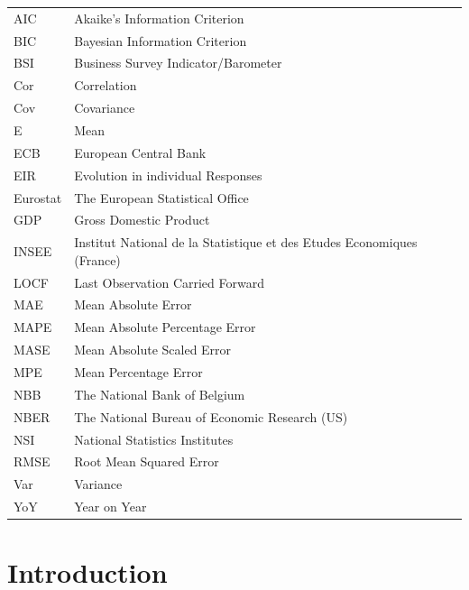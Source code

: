 \documentclass[12pt,a4paper,oneside]{book}
\begin{document}
\begin{tabular}{l l}
  AIC       & Akaike's Information Criterion \\
  BIC		& Bayesian Information Criterion \\
  BSI       & Business Survey Indicator/Barometer \\
  Cor       & Correlation \\
  Cov       & Covariance \\
  E         & Mean \\
  ECB       & European Central Bank \\
  EIR       & Evolution in individual Responses \\
  Eurostat  & The European Statistical Office \\
  GDP       & Gross Domestic Product \\
  INSEE     & Institut National de la Statistique et des Etudes Economiques (France) \\
  LOCF 		& Last Observation Carried Forward \\
  MAE 		& Mean Absolute Error \\
  MAPE		& Mean Absolute Percentage Error \\
  MASE 		& Mean Absolute Scaled Error \\
  MPE 		& Mean Percentage Error \\
  NBB       & The National Bank of Belgium \\
  NBER      & The National Bureau of Economic Research (US) \\
  NSI       & National Statistics Institutes \\
  RMSE 		& Root Mean Squared Error \\
  Var       & Variance \\
  YoY       & Year on Year \\
\end{tabular}

\tableofcontents

\newpage
\setcounter{page}{0}


\chapter{Introduction}

\end{document}
